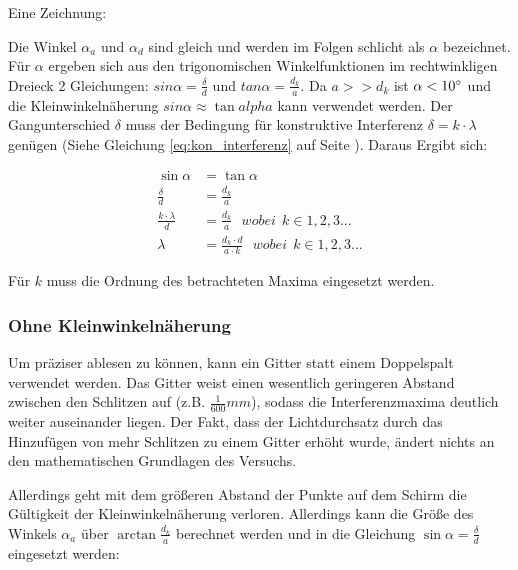 	Eine Zeichnung:
	
	
	Die Winkel $\alpha_a$ und $\alpha_d$ sind gleich und werden im Folgen schlicht als $\alpha$ bezeichnet. Für $\alpha$ ergeben sich aus den trigonomischen Winkelfunktionen im rechtwinkligen Dreieck 2 Gleichungen: $sin{\alpha}=\frac{\delta}{d}$ und $tan{\alpha}=\frac{d_k}{a}$. Da $a>>d_k$ ist $\alpha<10 \degree$ und die Kleinwinkelnäherung $sin{\alpha} \approx \tan{alpha}$ kann verwendet werden. Der Gangunterschied $\delta$ muss der Bedingung für konstruktive Interferenz $\delta = k \cdot \lambda$ genügen (Siehe Gleichung \ref{eq:kon_interferenz} auf Seite \pageref{eq:kon_interferenz}). Daraus Ergibt sich:
	
	\begin{align}
		\sin{\alpha} &= \tan{\alpha} \\
		\frac{\delta}{d} &= \frac{d_k}{a} \\
		\frac{k \cdot \lambda}{d} &= \frac{d_k}{a}  \ \ \ wobei \ \ k \in 1,2,3... \\
		\lambda &= \frac{d_{k} \cdot d}{a \cdot k}  \ \ \ wobei \ \ k \in 1,2,3...
	\end{align}
	
	Für $k$ muss die Ordnung des betrachteten Maxima eingesetzt werden.
		

\subsubsection{Ohne Kleinwinkelnäherung}

	Um präziser ablesen zu können, kann ein Gitter statt einem Doppelspalt verwendet werden. Das Gitter weist einen wesentlich geringeren Abstand zwischen den Schlitzen auf (z.B. $\frac{1}{600}mm$), sodass die Interferenzmaxima deutlich weiter auseinander liegen. Der Fakt, dass der Lichtdurchsatz durch das Hinzufügen von mehr Schlitzen zu einem Gitter erhöht wurde, ändert nichts an den mathematischen Grundlagen des Versuchs.
	
	Allerdings geht mit dem größeren Abstand der Punkte auf dem Schirm die Gültigkeit der Kleinwinkelnäherung verloren. Allerdings kann die Größe des Winkels $\alpha_a$ über $\arctan{\frac{d_k}{a}}$ berechnet werden und in die Gleichung $\sin{\alpha} = \frac{\delta}{d}$ eingesetzt werden:
	
